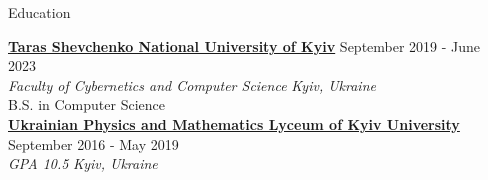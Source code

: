 \documentclass[
	11pt, %
]{resume} %
\begin{document}

\begin{rSection}{Education}

    \href{http://csc.knu.ua/en/}{\color{blue}\textbf{Taras Shevchenko National University of Kyiv}} \hfill {September 2019 - June 2023} \\ 
    \textit{Faculty of Cybernetics and Computer Science} \hfill \textit{Kyiv, Ukraine} \\ 
    B.S. in Computer Science \\

    \href{http://upml.knu.ua/}{\color{blue}\textbf{Ukrainian Physics and Mathematics Lyceum of Kyiv University}} \hfill {September 2016 - May 2019} \\ 
    \textit{GPA 10.5} \hfill \textit{Kyiv, Ukraine}
\end{rSection}





\end{document}
